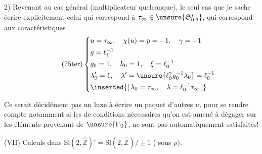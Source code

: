 2) Revenant au cas général (multiplicateur quelconque), le seul cas que je sache écrire explicitement
  celui qui correspond à
$\tau_\infty\in\unsure{\mathfrak S_{0,3}^{*}}$,
qui correspond aux caractéristiques
\[
\tag{75ter}
\left\{
\begin{aligned}
&u=\tau_\infty,\quad\chi(u)=p=-1,\quad\gamma=-1\\
&g=\ell_1^{-1}\\
&g_0=1,\quad h_0=1,\quad\xi=\ell_0^{-1}\\
&\lambda'_0=1,\quad\lambda'=\unsure{\ell_0^\gamma g_0^{-1}\lambda_0}=\ell_0^{-1}\\
&\inserted{[\,\lambda_0=\tau_\infty,\quad\lambda=\ell_0^{-1}\tau_\infty\,]}
\end{aligned}
\right.
\]

Ce serait décidément pas un luxe  à écrire un paquet d'autres $u$, pour se rendre compte notamment si les  de conditions nécessaires qu'on est amené à dégager sur les éléments provenant de $\unsure{\Gamma_{\mathbb Q}}$, ne sont pas automatiquement satisfaites!


(VII) Calculs dans $\mathrm{Sl}(2,\widehat{\mathbb Z})'=\mathrm{Sl}(2,\widehat{\mathbb Z})/\pm1$
( sous $\rho$).



